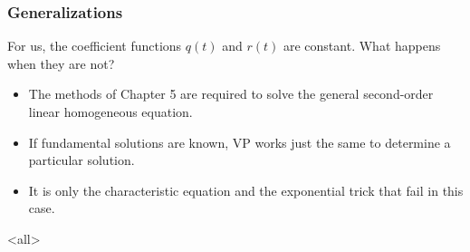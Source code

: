 \begin{frame}

\frametitle{Generalizations}
\label{generalizations}

For us, the coefficient functions $ q(t) $ and $ r(t) $ are constant. What happens when they are not?

\begin{itemize}
\item The methods of Chapter 5 are required to solve the general second-order linear homogeneous equation.

\item If fundamental solutions are known, VP works just the same to determine a particular solution.

\item It is only the characteristic equation and the exponential trick that fail in this case.

\end{itemize}

\end{frame}

\mode<all>


\mode*


